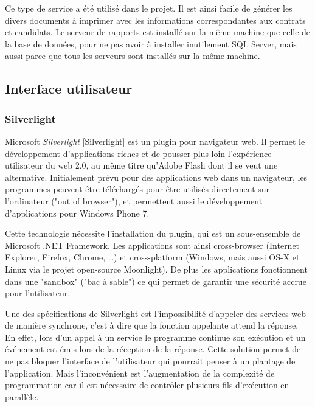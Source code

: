 Ce type de service a été utilisé dans le projet.
Il est ainsi facile de générer les divers documents à imprimer avec les informations correspondantes aux contrats et candidats.
Le serveur de rapports est installé sur la même machine que celle de la base de données, pour ne pas avoir à installer inutilement SQL Server, mais aussi parce que tous les serveurs sont installés sur la même machine.


\subsection{Interface utilisateur}


\subsubsection{Silverlight}
\label{Silverlight}

Microsoft \textit{Silverlight} [Silverlight] est un plugin pour navigateur web.
Il permet le développement d'applications riches et de pousser plus loin l'expérience utilisateur du web 2.0, au même titre qu'Adobe Flash dont il se veut une alternative.
Initialement prévu pour des applications web dans un navigateur, les programmes peuvent être téléchargés pour être utilisés directement sur l'ordinateur ("out of browser"), et permettent aussi le développement d'applications pour Windows Phone 7.

Cette technologie nécessite l'installation du plugin, qui est un sous-ensemble de Microsoft .NET Framework.
Les applications sont ainsi cross-browser (Internet Explorer, Firefox, Chrome, \ldots) et cross-platform (Windows, mais aussi OS-X et Linux via le projet open-source Moonlight).
De plus les applications fonctionnent dans une "sandbox" ("bac à sable") ce qui permet de garantir une sécurité accrue pour l'utilisateur.

Une des spécifications de Silverlight est l'impossibilité d'appeler des services web de manière synchrone, c'est à dire que la fonction appelante attend la réponse.
En effet, lors d'un appel à un service le programme continue son exécution et un événement est émis lors de la réception de la réponse.
Cette solution permet de ne pas bloquer l'interface de l'utilisateur qui pourrait penser à un plantage de l'application.
Mais l'inconvénient est l'augmentation de la complexité de programmation car il est nécessaire de contrôler plusieurs fils d'exécution en parallèle.


